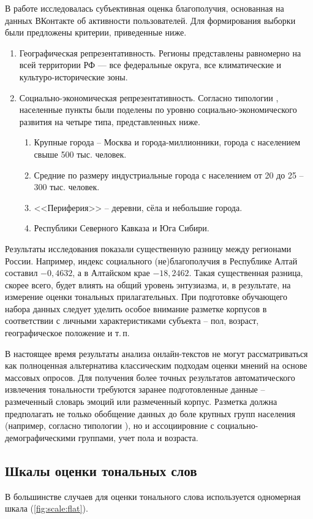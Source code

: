 В работе \cite{ЩекотинЕ.2020} исследовалась субъективная оценка благополучия, основанная на данных ВКонтакте об активности пользователей. Для формирования выборки были предложены критерии, приведенные ниже. 
\begin{enumerate}
	\item Географическая репрезентативность. Регионы представлены равномерно на всей территории РФ — все федеральные округа, все климатические и культуро-исторические зоны.
	\item Социально-экономическая репрезентативность. Согласно типологии \cite{Zubarevich2013}, населенные пункты были поделены по уровню социально-экономического развития на четыре типа, представленных ниже.
	\begin{enumerate}
		\item Крупные города -- Москва и города-миллионники, города с населением свыше 500 тыс. человек.
		\item  Средние по размеру индустриальные города с населением от 20 до 25 -- 300 тыс. человек.
		\item <<Периферия>> -- деревни, сёла и небольшие города.
		\item Республики Северного Кавказа и Юга Сибири.
	\end{enumerate}
\end{enumerate}
Результаты исследования показали существенную разницу между регионами России. Например, индекс социального (не)благополучия в Республике Алтай составил $-0,4632$, а в Алтайском крае $-18,2462$. Такая существенная разница, скорее всего, будет влиять на общий уровень энтузиазма, и, в результате, на измерение оценки тональных прилагательных. 
При подготовке обучающего набора данных следует уделить особое внимание разметке корпусов в соответствии с личными характеристиками субъекта -- пол, возраст, географическое положение и т.\,п.

В настоящее время результаты анализа онлайн-текстов не могут рассматриваться как полноценная альтернатива классическим подходам оценки мнений на основе массовых опросов. \cite{Дудина2017} Для получения более точных результатов автоматического извлечения тональности требуются заранее подготовленные данные -- размеченный словарь эмоций или размеченный корпус. Разметка должна предполагать не только обобщение данных до боле крупных групп населения (например, согласно типологии \cite{Zubarevich2013}), но и ассоциировние с социально-демографическими группами, учет пола и возраста.
\subsection{Шкалы оценки тональных слов}
В большинстве случаев для оценки тонального слова используется одномерная шкала (\ref{fig:scale:flat}).  

